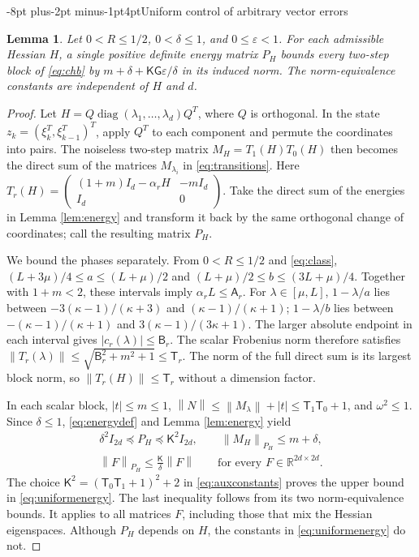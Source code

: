 \documentclass[pdflatex,sn-mathphys-num]{sn-jnl}
\makeatletter
\renewcommand\subsection{\@startsection{subsection}{2}{\z@}%
  {-8pt plus-2pt minus-1pt}{4pt}{\subsectionfont}}
\theoremstyle{thmstyleone}
\newtheorem{lemma}{Lemma}
\theoremstyle{thmstyletwo}
\newcommand{\R}{\mathbb R}
\newcommand{\diag}{\operatorname{diag}}
\newcommand{\cT}{\mathsf T}
\newcommand{\cK}{\mathsf K}
\newcommand{\cG}{\mathsf G}
\newcommand{\norm}[1]{\left\lVert #1\right\rVert}
\makeatother
\begin{document}
\subsection{Uniform control of arbitrary vector errors}
\begin{lemma}\label{lem:vector}
Let $0<R\leq1/2$, $0<\delta\leq1$, and $0\leq\varepsilon<1$.
For each admissible Hessian $H$, a single positive definite energy
matrix $P_H$ bounds every two-step block of \eqref{eq:chb}
by $m+\delta+\cK\cG\varepsilon/\delta$ in its induced norm.
The norm-equivalence constants are independent of $H$ and $d$.
\end{lemma}
\begin{proof}
Let $H=Q\diag(\lambda_1,\ldots,\lambda_d)Q^T$, where $Q$ is
orthogonal. In the state $z_k=(\xi_k^T,\xi_{k-1}^T)^T$, apply
$Q^T$ to each component and permute the coordinates into pairs.
The noiseless two-step matrix $M_H=T_1(H)T_0(H)$ then becomes
the direct sum of the matrices $M_{\lambda_i}$ in
\eqref{eq:transitions}. Here
$T_r(H)=\left(\begin{smallmatrix}(1+m)I_d-\alpha_rH&-mI_d\\
I_d&0\end{smallmatrix}\right)$.
Take the direct sum of the energies in Lemma \ref{lem:energy}
and transform it back by the same orthogonal change of coordinates;
call the resulting matrix $P_H$.

We bound the phases separately. From $0<R\leq1/2$ and
\eqref{eq:class},
$(L+3\mu)/4\leq a\leq(L+\mu)/2$ and
$(L+\mu)/2\leq b\leq(3L+\mu)/4$.
Together with $1+m<2$, these intervals imply
$\alpha_rL\leq\mathsf A_r$. For $\lambda\in[\mu,L]$,
$1-\lambda/a$ lies between $-3(\kappa-1)/(\kappa+3)$ and
$(\kappa-1)/(\kappa+1)$; $1-\lambda/b$ lies between
$-(\kappa-1)/(\kappa+1)$ and $3(\kappa-1)/(3\kappa+1)$.
The larger absolute endpoint in each interval gives
$|c_r(\lambda)|\leq\mathsf B_r$.
The scalar Frobenius norm therefore satisfies
$\norm{T_r(\lambda)}\leq\sqrt{\mathsf B_r^2+m^2+1}\leq\cT_r$.
The norm of the full direct sum is its largest block norm, so
$\norm{T_r(H)}\leq\cT_r$ without a dimension factor.

In each scalar block, $|t|\leq m\leq1$,
$\norm{N}\leq\norm{M_\lambda}+|t|\leq\cT_1\cT_0+1$, and
$\omega^2\leq1$. Since $\delta\leq1$,
\eqref{eq:energydef} and Lemma \ref{lem:energy} yield
\begin{equation}\label{eq:uniformenergy}
\begin{gathered}
 \delta^2I_{2d}\preceq P_H\preceq\cK^2I_{2d},\qquad
 \norm{M_H}_{P_H}\leq m+\delta,\\
 \norm{F}_{P_H}\leq\frac{\cK}{\delta}\norm{F}
 \qquad\text{for every }F\in\R^{2d\times2d}.
\end{gathered}
\end{equation}
The choice $\cK^2=(\cT_0\cT_1+1)^2+2$ in
\eqref{eq:auxconstants} proves the upper bound in
\eqref{eq:uniformenergy}. The last inequality follows from its
two norm-equivalence bounds. It applies to all matrices $F$,
including those that mix the Hessian eigenspaces. Although $P_H$
depends on $H$, the constants in \eqref{eq:uniformenergy} do not.


\end{proof}
\end{document}
